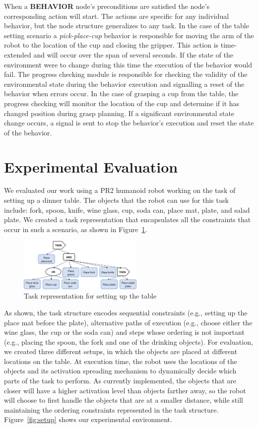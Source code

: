 \documentclass[conference]{article}
\begin{document}
When a {\bf BEHAVIOR} node's preconditions are satisfied the node's corresponding action will start. The actions are specific for any individual behavior, but the node structure generalizes to any task. In the case of the table setting scenario a \emph{pick-place-cup} behavior is responsible for moving the arm of the robot to the location of the cup and closing the gripper. This action is time-extended and will occur over the span of several seconds. If the state of the environment were to change during this time the execution of the behavior would fail. The progress checking module is responsible for checking the validity of the environmental state during the behavior execution and signalling a reset of the behavior when errors occur. In the case of grasping a cup from the table, the progress checking will monitor the location of the cup and determine if it has changed position during grasp planning. If a significant environmental state change occurs, a signal is sent to stop the behavior's execution and reset the state of the behavior.


\section{Experimental Evaluation}
\label{evaluation}

We evaluated our work using a PR2 humanoid robot working on the task of setting up a dinner table. The objects that the robot can use for this task include: fork, spoon, knife, wine glass, cup, soda can, place mat, plate, and salad plate. We created a task representation that encapsulates all the constraints that occur in such a scenario, as shown in Figure~\ref{fig:set_table}. 

\begin{figure}
\centering
  \includegraphics[width=6cm]{set_table_task}
\caption{Task representation for setting up the table}
\label{fig:set_table}       %
\end{figure}

As shown, the task structure encodes sequential constraints (e.g., setting up the place mat before the plate), alternative paths of execution (e.g., choose either the wine glass, the cup or the soda can) and steps whose ordering is not important (e.g., placing the spoon, the fork and one of the drinking objects). For evaluation, we created three different setups, in which the objects are placed at different locations on the table. At execution time, the robot uses the locations of the objects and its activation spreading mechanism to dynamically decide which parts of the task to perform. As currently implemented, the objects that are closer will have a higher activation level than objects farther away, so the robot will choose to first handle the objects that are at a smaller distance, while still maintaining the ordering constraints represented in the task structure. Figure~\ref{fig:setup} shows our experimental environment.
\end{document}
